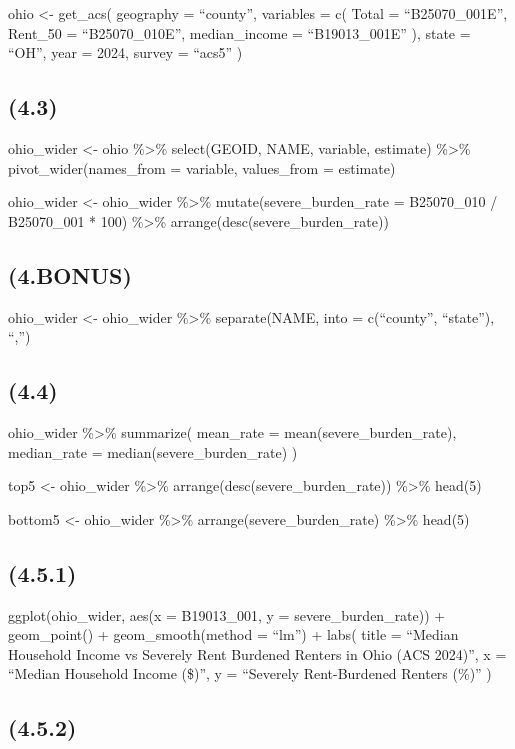 \documentclass[
]{article}
\begin{document}
ohio \textless- get\_acs( geography = ``county'', variables = c( Total =
``B25070\_001E'', Rent\_50 = ``B25070\_010E'', median\_income =
``B19013\_001E'' ), state = ``OH'', year = 2024, survey = ``acs5'' )

\subsection{(4.3)}\label{section-10}

ohio\_wider \textless- ohio \%\textgreater\% select(GEOID, NAME,
variable, estimate) \%\textgreater\% pivot\_wider(names\_from =
variable, values\_from = estimate)

ohio\_wider \textless- ohio\_wider \%\textgreater\%
mutate(severe\_burden\_rate = B25070\_010 / B25070\_001 * 100)
\%\textgreater\% arrange(desc(severe\_burden\_rate))

\subsection{(4.BONUS)}\label{bonus-1}

ohio\_wider \textless- ohio\_wider \%\textgreater\% separate(NAME, into
= c(``county'', ``state''), ``,'')

\subsection{(4.4)}\label{section-11}

ohio\_wider \%\textgreater\% summarize( mean\_rate =
mean(severe\_burden\_rate), median\_rate = median(severe\_burden\_rate)
)

top5 \textless- ohio\_wider \%\textgreater\%
arrange(desc(severe\_burden\_rate)) \%\textgreater\% head(5)

bottom5 \textless- ohio\_wider \%\textgreater\%
arrange(severe\_burden\_rate) \%\textgreater\% head(5)

\subsection{(4.5.1)}\label{section-12}

ggplot(ohio\_wider, aes(x = B19013\_001, y = severe\_burden\_rate)) +
geom\_point() + geom\_smooth(method = ``lm'') + labs( title = ``Median
Household Income vs Severely Rent Burdened Renters in Ohio (ACS 2024)'',
x = ``Median Household Income (\$)'', y = ``Severely Rent-Burdened
Renters (\%)'' )

\subsection{(4.5.2)}\label{section-13}
\end{document}
